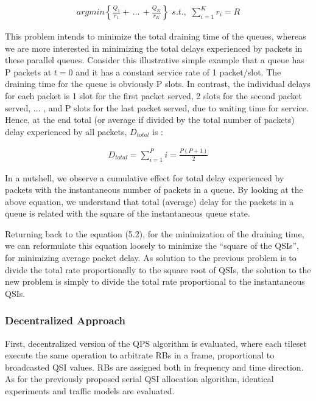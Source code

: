 \begin{align}
arg min  \left\{ \frac{Q_{1}}{r_{1}} + \,  ... \, + \frac{Q_{K}}{r_{K}} \right\} \, \, s.t., \, \, \sum\limits_{i=1}^K r_{i} = R
\end{align} 

This problem intends to minimize the total draining time of the queues, whereas we are more interested in minimizing the total delays experienced by packets in these parallel queues. Consider this illustrative simple example that a queue has P packets at $t=0$ and it has a constant service rate of 1 packet/slot. The draining time for the queue is obviously P slots. In contrast, the individual delays for each packet is 1 slot for the first packet served, 2 slots for the second packet served, ... , and P slots for the last packet served, due to waiting time for service. Hence, at the end total (or average if divided by the total number of packets) delay experienced by all packets, $D_{total}$ is :

\begin{align}
D_{total} = \sum \limits_{i=1}^{P} i = \frac{P(P+1)}{2}
\end{align}

In a nutshell, we observe a cumulative effect for total delay experienced by packets with the instantaneous number of packets in a queue. By looking at the above equation, we understand that total (average) delay for the packets in a queue is related with the square of the instantaneous queue state. 

Returning back to the equation (5.2), for the minimization of the draining time, we can reformulate this equation loosely to minimize the \textquotedblleft square of the QSIs\textquotedblright, for minimizing average packet delay. As solution to the previous problem is to divide the total rate proportionally to the square root of QSIs, the solution to the new problem is simply to divide the total rate proportional to the instantaneous QSIs. 

\subsubsection{Decentralized Approach}

First, decentralized version of the QPS algorithm is evaluated, where each tileset execute the same operation to arbitrate RBs in a frame, proportional to broadcasted QSI values. RBs are assigned both in frequency and time direction. As for the previously proposed serial QSI allocation algorithm, identical experiments and traffic models are evaluated. 

